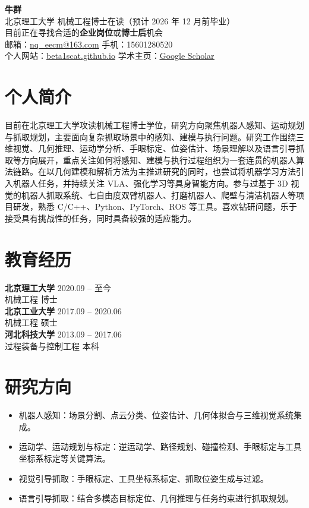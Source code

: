 \documentclass[11pt,a4paper]{article}
\newcommand{\entry}[4]{%
  \textbf{#1} \hfill #2\\
  {\color{textgray}#3} \hfill {#4}\\[-2pt]
}
\newcommand{\textlink}[2]{\href{#1}{\color{linkblue}\underline{#2}}}
\begin{document}
{\LARGE\bfseries\color{titlecolor} 牛群}\\[4pt]
北京理工大学 \quad 机械工程博士在读（预计 2026 年 12 月前毕业）\\
目前正在寻找合适的\textbf{企业岗位}或\textbf{博士后}机会\\
邮箱：\textlink{mailto:nq_eecm@163.com}{nq\_eecm@163.com} \quad 手机：15601280520\\
个人网站：\textlink{https://beta1scat.github.io/}{beta1scat.github.io} \quad 学术主页：\textlink{https://scholar.google.com/citations?hl=en\&user=6E4Hd8UAAAAJ}{Google Scholar}

\section*{个人简介}
目前在北京理工大学攻读机械工程博士学位，研究方向聚焦机器人感知、运动规划与抓取规划，主要面向复杂抓取场景中的感知、建模与执行问题。研究工作围绕三维视觉、几何推理、运动学分析、手眼标定、位姿估计、场景理解以及语言引导抓取等方向展开，重点关注如何将感知、建模与执行过程组织为一套连贯的机器人算法链路。在以几何建模和解析方法为主推进研究的同时，也尝试将机器学习方法引入机器人任务，并持续关注 VLA、强化学习等具身智能方向。参与过基于 3D 视觉的机器人抓取系统、七自由度双臂机器人、打磨机器人、爬壁与清洁机器人等项目研发，熟悉 C/C++、Python、PyTorch、ROS 等工具。喜欢钻研问题，乐于接受具有挑战性的任务，同时具备较强的适应能力。

\section*{教育经历}
\entry{北京理工大学}{2020.09 -- 至今}{机械工程}{博士}
\entry{北京工业大学}{2017.09 -- 2020.06}{机械工程}{硕士}
\entry{河北科技大学}{2013.09 -- 2017.06}{过程装备与控制工程}{本科}

\section*{研究方向}
\begin{itemize}
	\item 机器人感知：场景分割、点云分类、位姿估计、几何体拟合与三维视觉系统集成。
	\item 运动学、运动规划与标定：逆运动学、路径规划、碰撞检测、手眼标定与工具坐标系标定等关键算法。
	\item 视觉引导抓取：手眼标定、工具坐标系标定、抓取位姿生成与过滤。
	\item 语言引导抓取：结合多模态目标定位、几何推理与任务约束进行抓取规划。
\end{itemize}
\end{document}
